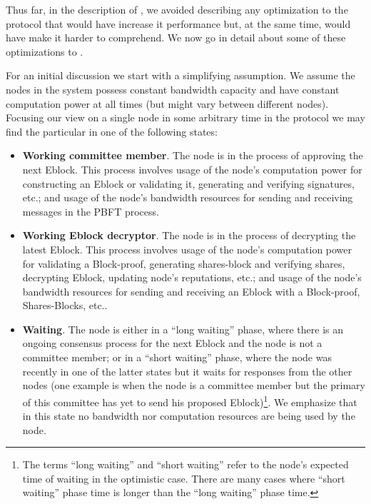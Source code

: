 


Thus far, in the description of \nameNS, we avoided describing any optimization to the protocol that would have increase it performance but, at the same time, would have make it harder to comprehend. We now go in detail about some of these optimizations to \nameNS. 

For an initial discussion we start with a simplifying assumption. We assume the nodes in the system possess constant bandwidth capacity and have constant computation power at all times (but might vary between different nodes). Focusing our view on a single node in some arbitrary time in the protocol we may find the particular in one of the following states:

\begin{itemize}
\item \textbf{Working committee member}. The node is in the process of approving the next Eblock. This process involves usage of the node’s computation power for constructing an Eblock or validating it, generating and verifying signatures, etc.; and usage of the node’s bandwidth resources for sending and receiving messages in the PBFT process.

\item \textbf{Working Eblock decryptor}. The node is in the process of decrypting the latest Eblock. This process involves usage of the node’s computation power for validating a Block-proof, generating shares-block and verifying shares, decrypting Eblock, updating node’s reputations, etc.;  and usage of the node’s bandwidth resources for sending and receiving an Eblock with a Block-proof, Shares-Blocks, etc..

\item \textbf{Waiting}. The node is either in a “long waiting” phase, where there is an ongoing consensus process for the next Eblock and the node is not a committee member; or in a “short waiting” phase, where the node was recently in one of the latter states but it waits for responses from the other nodes (one example is when the node is a committee member but the primary of this committee has yet to send his proposed Eblock)\footnote{The terms “long waiting” and “short waiting” refer to the node’s expected time of waiting in the optimistic case. There are many cases where “short waiting” phase time is longer than the “long waiting” phase time.}. We emphasize that in this state no bandwidth nor computation resources are being used by the node.
\end{itemize}

